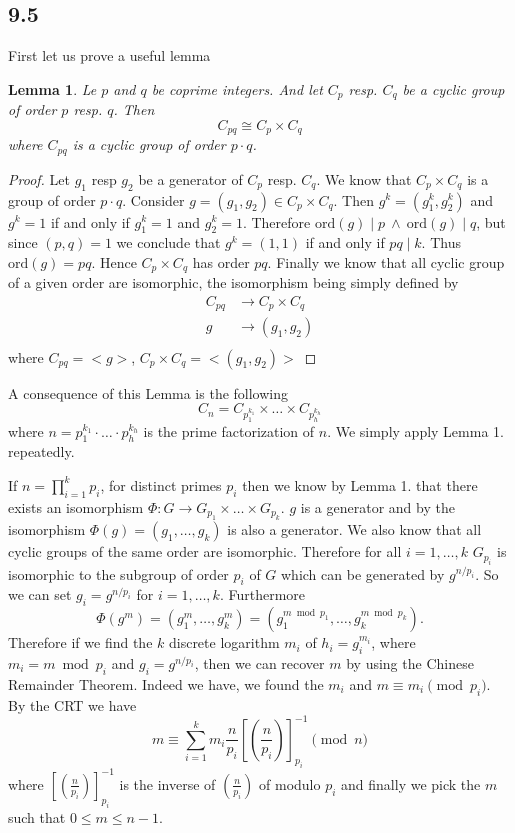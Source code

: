 \documentclass[12pt,a4paper]{article}
\newtheorem{lemma}{Lemma}
\newcommand {\ord}{\mathrm{ord}}
\begin{document}
\subsection{9.5}
First let us prove a useful lemma
\begin{lemma}
    Le $p$ and $q$ be coprime integers. And let $C_p$ resp. $C_q$ be a cyclic group of order $p$ resp. $q$.
    Then
    \[
        C_{pq} \cong C_p \times C_q
    \]
    where $C_{pq}$ is a cyclic group of order $p\cdot q$.
\end{lemma}
\begin{proof}
    Let $g_1$ resp $g_2$ be a generator of $C_p$ resp. $C_q$. We know that $C_p \times C_q$ is a group of order $p\cdot q$.
    Consider $g = (g_1,g_2) \in C_p\times C_q$. Then $g^k = (g_1^k,g_2^k)$ and $g^k = 1$ if and only if $g_1^k = 1$ and $g_2^k = 1$.
    Therefore $\ord(g) \mid p \:\land\: \ord(g) \mid q$, but since $(p,q)=1$ we conclude that $g^k = (1,1)$ if and only if $pq \mid k$.
    Thus $\ord(g)  = pq$. Hence $C_p\times C_q$ has order $pq$.
    Finally we know that all cyclic group of a given order are isomorphic, the isomorphism being simply defined by
    \[
        \begin{split}
            C_{pq} &\rightarrow C_p \times C_q\\
            g &\rightarrow (g_1,g_2)\\
        \end{split}
    \]
    where $C_{pq} = <g>$, $C_p \times C_q = <(g_1,g_2)>$
\end{proof}
A consequence of this Lemma is the following
\[
    C_n = C_{p_1^{k_1}} \times \dots \times C_{p_h^{k_h}} 
\]
where $n=p_1^{k_1}\cdot\dots\cdot p_h^{k_h}$ is the prime factorization of $n$. We simply apply Lemma 1. repeatedly.

If $n = \prod_{i=1}^{k} p_i$, for distinct primes $p_i$ then
we know by Lemma 1. that there exists an isomorphism $\Phi:G\rightarrow G_{p_1} \times\dots\times G_{p_k}$.
$g$ is a generator and by the isomorphism $\Phi(g) = (g_1,\dots,g_k)$ is also a generator.
We also know that all cyclic groups of the same order are isomorphic. Therefore for all $i=1,\dots,k$ $G_{p_i}$ is isomorphic
to the subgroup of order $p_i$ of $G$ which can be generated by $g^{n/p_i}$. So we can set $g_i = g^{n/p_i}$ for $i=1,\dots,k$.
Furthermore 
\[
    \Phi(g^m) = (g_1^m,\dots,g_k^m) = (g_1^{m \bmod p_1},\dots,g_k^{ m \bmod p_k}).
\]
Therefore if we find the $k$ discrete logarithm $m_i$ of
$h_i = g_i^{m_i}$, where $m_i = m \bmod p_i$ and $g_i = g^{n/p_i}$, then we can recover $m$ by using the Chinese Remainder Theorem.
Indeed we have, we found the $m_i$ and $m \equiv m_i \pmod {p_i}$. By the CRT we have 
\[
    m \equiv \sum_{i=1}^km_i \frac{n}{p_i}\left[\left(\frac{n}{p_i}\right)\right]_{p_i}^{-1} \pmod n
\]
where $\left[\left(\frac{n}{p_i}\right)\right]_{p_i}^{-1}$ is the inverse of $ (\frac{n}{p_i})$ of modulo $p_i$ and finally we pick the $m$ such that $0\leq m \leq n-1$.
\end{document}
